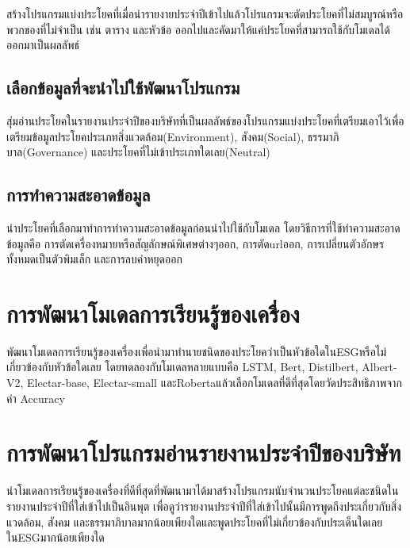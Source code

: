 \enskip \enskip \enskip สร้างโปรแกรมแบ่งประโยคที่เมื่อนำรายงายประจำปีเข้าไปแล้วโปรแกรมจะตัดประโยคที่ไม่สมบูรณ์หรือพวกของที่ไม่จำเป็น 
เช่น ตาราง และหัวข้อ ออกไปและคัดมาให้แค่ประโยคที่สามารถใช้กับโมเดลได้ออกมาเป็นผลลัพธ์


\subsection{เลือกข้อมูลที่จะนำไปใช้พัฒนาโปรแกรม}

\enskip \enskip \enskip สุ่มอ่านประโยคในรายงานประจำปีของบริษัทที่เป็นผลลัพธ์ของโปรแกรมแบ่งประโยคที่เตรียมเอาไว้เพื่อเตรียมข้อมูลประโยคประเภทสิ่งแวดล้อม(Environment), 
สังคม(Social), ธรรมาภิบาล(Governance) และประโยคที่ไม่เข้าประเภทใดเลย(Neutral)
  

\subsection{การทำความสะอาดข้อมูล}

\enskip \enskip \enskip นำประโยคที่เลือกมาทำการทำความสะอาดข้อมูลก่อนนำไปใช้กับโมเดล 
โดยวิธีการที่ใช้ทำความสะอาดข้อมูลคือ การตัดเครื่องหมายหรือสัญลักษณ์พิเศษต่างๆออก, การตัดurlออก, การเปลี่ยนตัวอักษรทั้งหมดเป็นตัวพิมเล็ก และการลบคำหยุดออก


\section{การพัฒนาโมเดลการเรียนรู้ของเครื่อง}

\enskip \enskip \enskip พัฒนาโมเดลการเรียนรู้ของเครื่องเพื่อนำมาทำนายชนิดของประโยคว่าเป็นหัวข้อใดในESGหรือไม่เกี่ยวข้องกับหัวข้อใดเลย 
โดยทดลองกับโมเดลหลายแบบคือ LSTM, Bert, Distilbert, Albert-V2, Electar-base, Electar-small และRobertaแล้วเลือกโมเดลที่ดีที่สุดโดยวัดประสิทธิภาพจากค่า Accuracy


\section{การพัฒนาโปรแกรมอ่านรายงานประจำปีของบริษัท}

\enskip \enskip \enskip นำโมเดลการเรียนรู้ของเครื่องที่ดีที่สุดที่พัฒนามาได้มาสร้างโปรแกรมนับจำนวนประโยคแต่ละชนิดในรายงานประจำปีที่ใส่เข้าไปเป็นอินพุต
เพื่อดูว่ารายงานประจำปีที่ใส่เข้าไปนั้นมีการพูดถึงประเกี่ยวกับสิ่งแวดล้อม, 
สังคม และธรรมาภิบาลมากน้อยเพียงใดและพูดประโยคที่ไม่เกี่ยวข้องกับประเด็นใดเลยในESGมากน้อยเพียงใด



